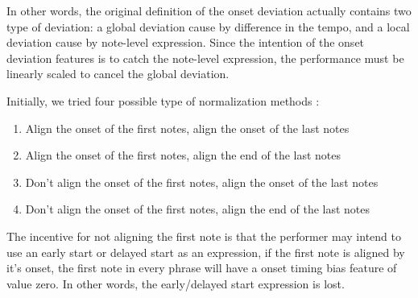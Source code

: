 In other words, the original definition of the onset deviation actually contains two type of deviation: a global deviation cause by difference in the tempo, and a local deviation cause by note-level expression. Since the intention of the onset deviation features is to catch the note-level expression, the performance must be linearly scaled to cancel the global deviation.


   Initially, we tried four possible type of normalization methods : 
   \begin{enumerate}
      \item Align the onset of the first notes, align the onset of the last notes
      \item Align the onset of the first notes, align the end of the last notes
      \item Don't align the onset of the first notes, align the onset of the last notes
      \item Don't align the onset of the first notes, align the end of the last notes
   \end{enumerate}
    The incentive for not aligning the first note is that the performer may intend to use an early start or delayed start as an expression, if the first note is aligned by it's onset, the first note in every phrase will have a onset timing bias feature of value zero. In other words, the early/delayed start expression is lost. %

